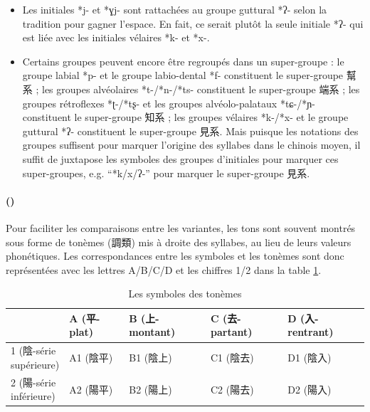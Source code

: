 \documentclass{scrbook}
\newcounter{c}[subsubsection]
\newcommand{\stpc}[1]{\stepcounter{#1}}
\begin{document}
\begin{sloppypar}
\begin{itemize}
\item{Les initiales *j- et *ɣj- sont rattachées au groupe guttural *ʔ- selon la tradition pour gagner l'espace. En fait, ce serait plutôt la seule initiale *ʔ- qui est liée avec les initiales vélaires *k- et *x-.}

\item{Certains groupes peuvent encore être regroupés dans un super-groupe : le groupe labial *p- et le groupe labio-dental *f- constituent le super-groupe 幫系 ; les groupes alvéolaires *t-/*n-/*ts- constituent le super-groupe 端系 ; les groupes rétroflexes *ʈ-/*tʂ- et les groupes alvéolo-palataux *tɕ-/*ɲ- constituent le super-groupe 知系 ; les groupes vélaires *k-/*x- et le groupe guttural *ʔ- constituent le super-groupe 見系. Mais puisque les notations des groupes suffisent pour marquer l'origine des syllabes dans le chinois moyen, il suffit de juxtapose les symboles des groupes d'initiales pour marquer ces super-groupes, e.g. ``*k/x/ʔ-'' pour marquer le super-groupe 見系.}
\end{itemize}

\stpc{c}\paragraph{()}
Pour faciliter les comparaisons entre les variantes, les tons sont souvent montrés sous forme de tonèmes (調類) mis à droite des syllabes, au lieu de leurs valeurs phonétiques. Les correspondances entre les symboles et les tonèmes sont donc représentées avec les lettres A/B/C/D et les chiffres 1/2 dans la table \ref{tab:Tonème}. 

\begin{table}[htbp]
  \centering
    \begin{tabular}{lllll}
    \toprule
          & A (平-plat) & B (上-montant) & C (去-partant) & D (入-rentrant) \\
    \midrule
    \makecell{1 (陰-série \\supérieure)} & A1 (陰平) & B1 (陰上) & C1 (陰去) & D1 (陰入) \\
    \makecell{2 (陽-série \\inférieure)} & A2 (陽平) & B2 (陽上) & C2 (陽去) & D2 (陽入) \\
    \bottomrule
    \end{tabular}%
  \caption{Les symboles des tonèmes}
  \label{tab:Tonème}%
\end{table}%


\end{sloppypar}
\end{document}
